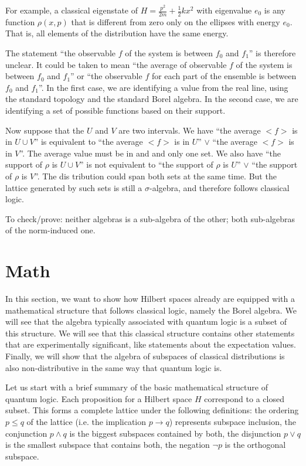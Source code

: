 \documentclass[10pt,twocolumn, nofootinbib]{revtex4-1}
\begin{document}
For example, a classical eigenstate of $H = \frac{p^2}{2m} + \frac{1}{2} k x^2$ with eigenvalue $e_0$ is any function $\rho(x,p)$ that is different from zero only on the ellipses with energy $e_0$. That is, all elements of the distribution have the same energy.

The statement ``the observable $f$ of the system is between $f_0$ and $f_1$'' is therefore unclear. It could be taken to mean ``the average of observable $f$ of the system is between $f_0$ and $f_1$'' or ``the observable $f$ for each part of the ensemble is between $f_0$ and $f_1$''. In the first case, we are identifying a value from the real line, using the standard topology and the standard Borel algebra. In the second case, we are identifying a set of possible functions based on their support.

Now suppose that the $U$ and $V$ are two intervals. We have ``the average $<f>$ is in $U \cup V$'' is  equivalent to ``the average $<f>$ is in $U$'' $\vee$ ``the average $<f>$ is in $V$''. The average value must be in and and only one set. We also have ``the support of $\rho$ is $U \cup V$'' is not equivalent to ``the support of $\rho$ is $U$'' $\vee$ ``the support of $\rho$ is $V$''. The dis tribution could span both sets at the same time. But the lattice generated by such sets is still a $\sigma$-algebra, and therefore follows classical logic.

To check/prove: neither algebras is a sub-algebra of the other; both sub-algebras of the norm-induced one.

\section{Math}

In this section, we want to show how Hilbert spaces already are equipped with a mathematical structure that follows classical logic, namely the Borel algebra. We will see that the algebra typically associated with quantum logic is a subset of this structure. We will see that this classical structure contains other statements that are experimentally significant, like statements about the expectation values. Finally, we will show that the algebra of subspaces of classical distributions is also non-distributive in the same way that quantum logic is.

Let us start with a brief summary of the basic mathematical structure of quantum logic. Each proposition for a Hilbert space $H$ correspond to a closed subset. This forms a complete lattice under the following definitions: the ordering $p \leq q$ of the lattice (i.e. the implication $p \to q$) represents subspace inclusion, the conjunction $p \wedge q$ is the biggest subspaces contained by both, the disjunction $p \vee q$ is the smallest subspace that contains both, the negation $\neg p$ is the orthogonal subspace.
\end{document}
